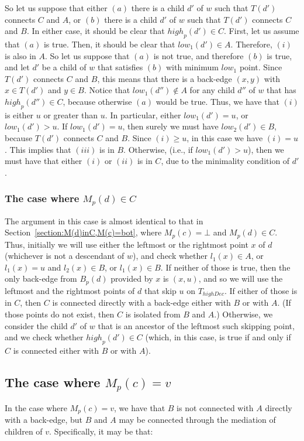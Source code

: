 \documentclass[11pt,a4paper]{article}
\begin{document}
So let us suppose that either $(a)$ there is a child $d'$ of $w$ such that $T(d')$ connects $C$ and $A$, or $(b)$ there is a child $d'$ of $w$ such that $T(d')$ connects $C$ and $B$. In either case, it should be clear that $\mathit{high}_p(d')\in C$. First, let us assume that $(a)$ is true. Then, it should be clear that $\mathit{low}_1(d')\in A$. Therefore, $(i)$ is also in $A$. So let us suppose that $(a)$ is not true, and therefore $(b)$ is true, and let $d'$ be a child of $w$ that satisfies $(b)$ with minimum $\mathit{low}_1$ point. Since $T(d')$ connects $C$ and $B$, this means that there is a back-edge $(x,y)$ with $x\in T(d')$ and $y\in B$. Notice that $\mathit{low}_1(d'')\notin A$ for any child $d''$ of $w$ that has $\mathit{high}_p(d'')\in C$, because otherwise $(a)$ would be true. Thus, we have that $(i)$ is either $u$ or greater than $u$. In particular, either $\mathit{low}_1(d')=u$, or $\mathit{low}_1(d')>u$. If $\mathit{low}_1(d')=u$, then surely we must have $\mathit{low}_2(d')\in B$, because $T(d')$ connects $C$ and $B$. Since $(i)\geq u$, in this case we have $(i)=u$. This implies that $(iii)$ is in $B$. Otherwise, (i.e., if $\mathit{low}_1(d')>u$), then we must have that either $(i)$ or $(ii)$ is in $C$, due to the minimality condition of $d'$.

\subsubsection{The case where $M_p(d)\in C$}
The argument in this case is almost identical to that in Section~\ref{section:M(d)inC,M(c)=bot}, where $M_p(c)=\bot$ and $M_p(d)\in C$. Thus, initially we will use either the leftmost or the rightmost point $x$ of $d$ (whichever is not a descendant of $w$), and check whether $l_1(x)\in A$, or $l_1(x)=u$ and $l_2(x)\in B$, or $l_1(x)\in B$. If neither of those is true, then the only back-edge from $B_p(d)$ provided by $x$ is $(x,u)$, and so we will use the leftmost and the rightmost points of $d$ that skip $u$ on $T_\mathit{highDec}$. If either of those is in $C$, then $C$ is connected directly with a back-edge either with $B$ or with $A$. (If those points do not exist, then $C$ is isolated from $B$ and $A$.) Otherwise, we consider the child $d'$ of $w$ that is an ancestor of the leftmost such skipping point, and we check whether $\mathit{high}_p(d')\in C$ (which, in this case, is true if and only if $C$ is connected either with $B$ or with $A$).


\subsection{The case where $M_p(c)=v$}
\label{section:Mp(c)=v}
In the case where $M_p(c)=v$, we have that $B$ is not connected with $A$ directly with a back-edge, but $B$ and $A$ may be connected through the mediation of children of $v$. Specifically, it may be that:\\
\end{document}
